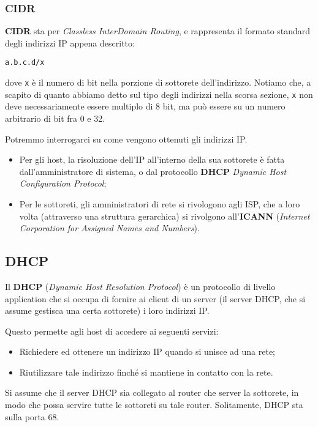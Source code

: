 \documentclass[a4paper,11pt]{article}
\begin{document}
\subsubsection{CIDR}
\textbf{CIDR} sta per \textit{Classless InterDomain Routing}, e rappresenta il formato standard degli indirizzi IP appena descritto:
\begin{lstlisting}[style=codestyle]	
a.b.c.d/x
\end{lstlisting}
dove \lstinline|x| è il numero di bit nella porzione di sottorete dell'indirizzo.
Notiamo che, a scapito di quanto abbiamo detto sul tipo degli indirizzi nella scorsa sezione, \lstinline|x| non deve necessariamente essere multiplo di 8 bit, ma può essere su un numero arbitrario di bit fra 0 e 32. 

Potremmo interrogarci su come vengono ottenuti gli indirizzi IP.
\begin{itemize}
	\item Per gli host, la risoluzione dell'IP all'interno della sua sottorete è fatta dall'amministratore di sistema, o dal protocollo \textbf{DHCP} \textit{Dynamic Host Configuration Protocol};
	\item Per le sottoreti, gli amministratori di rete si rivologono agli ISP, che a loro volta (attraverso una struttura gerarchica) si rivolgono all'\textbf{ICANN} (\textit{Internet Corporation for Assigned Names and Numbers}).
\end{itemize}

\subsection{DHCP}
Il \textbf{DHCP} (\textit{Dynamic Host Resolution Protocol}) è un protocollo di livello application che si occupa di fornire ai client di un server (il server DHCP, che si assume gestisca una certa sottorete) i loro indirizzi IP.

Questo permette agli host di accedere ai seguenti servizi:
\begin{itemize}
	\item Richiedere ed ottenere un indirizzo IP quando si unisce ad una rete;
	\item Riutilizzare tale indirizzo finché si mantiene in contatto con la rete.
\end{itemize}

Si assume che il server DHCP sia collegato al router che server la sottorete, in modo che possa servire tutte le sottoreti su tale router. Solitamente, DHCP sta sulla porta 68.
\end{document}
